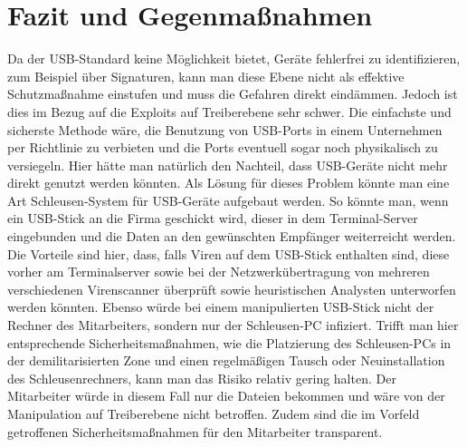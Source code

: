 \chapter{Fazit und Gegenmaßnahmen}
Da der USB-Standard keine Möglichkeit bietet, Geräte fehlerfrei zu identifizieren, zum Beispiel über Signaturen, kann man diese Ebene nicht als effektive Schutzmaßnahme einstufen und muss die Gefahren direkt eindämmen. Jedoch ist dies im Bezug auf die Exploits auf Treiberebene sehr schwer. Die einfachste und sicherste Methode wäre, die Benutzung von USB-Ports in einem Unternehmen per Richtlinie zu verbieten und die Ports eventuell sogar noch physikalisch zu versiegeln. Hier hätte man natürlich den Nachteil, dass USB-Geräte nicht mehr direkt genutzt werden könnten. Als Lösung für dieses Problem könnte man eine Art Schleusen-System für USB-Geräte aufgebaut werden. So könnte man, wenn ein USB-Stick an die Firma geschickt wird, dieser in dem Terminal-Server eingebunden und die Daten an den gewünschten Empfänger weiterreicht werden. Die Vorteile sind hier, dass, falls Viren auf dem USB-Stick enthalten sind, diese vorher am Terminalserver sowie bei der Netzwerkübertragung von mehreren verschiedenen Virenscanner überprüft sowie heuristischen Analysten unterworfen werden könnten. Ebenso würde bei einem manipulierten USB-Stick nicht der Rechner des Mitarbeiters, sondern nur der Schleusen-PC infiziert. Trifft man hier entsprechende Sicherheitsmaßnahmen, wie die Platzierung des Schleusen-PCs in der demilitarisierten Zone und einen regelmäßigen Tausch oder Neuinstallation des Schleusenrechners, kann man das Risiko relativ gering halten. Der Mitarbeiter würde in diesem Fall nur die Dateien bekommen und wäre von der Manipulation auf Treiberebene nicht betroffen. Zudem sind die im Vorfeld getroffenen Sicherheitsmaßnahmen für den Mitarbeiter transparent.